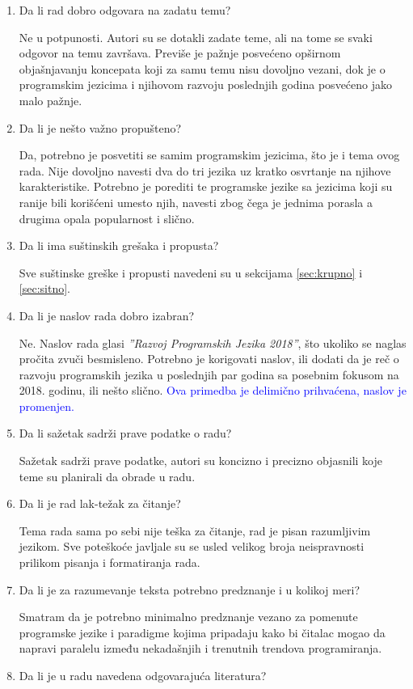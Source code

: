 \documentclass[a4paper]{report}
\newcommand{\odgovor}[1]{\textcolor{blue}{#1}}
\begin{document}
\begin{enumerate}
\item Da li rad dobro odgovara na zadatu temu?\par
Ne u potpunosti. Autori su se dotakli zadate teme, ali na tome se svaki odgovor na temu završava. Previše je pažnje posvećeno opširnom objašnjavanju koncepata koji za samu temu nisu dovoljno vezani, dok je o programskim jezicima i njihovom razvoju poslednjih godina posvećeno jako malo pažnje.
\item Da li je nešto važno propušteno?\par
Da, potrebno je posvetiti se samim programskim jezicima, što je i tema ovog rada. Nije dovoljno navesti dva do tri jezika uz kratko osvrtanje na njihove karakteristike. Potrebno je porediti te programske jezike sa jezicima koji su ranije bili korišćeni umesto njih, navesti zbog čega je jednima porasla a drugima opala popularnost i slično.
\item Da li ima suštinskih grešaka i propusta?\par
Sve suštinske greške i propusti navedeni su u sekcijama \ref{sec:krupno} i \ref{sec:sitno}.
\item Da li je naslov rada dobro izabran?\par
Ne. Naslov rada glasi \textit{''Razvoj Programskih Jezika 2018''}, što ukoliko se naglas pročita zvuči besmisleno. Potrebno je korigovati naslov, ili dodati da je reč o razvoju programskih jezika u poslednjih par godina sa posebnim fokusom na 2018. godinu, ili nešto slično.
\odgovor{Ova primedba je delimično prihvaćena, naslov je promenjen.}
\item Da li sažetak sadrži prave podatke o radu?\par
Sažetak sadrži prave podatke, autori su koncizno i precizno objasnili koje teme su planirali da obrade u radu.
\item Da li je rad lak-težak za čitanje?\par
Tema rada sama po sebi nije teška za čitanje, rad je pisan razumljivim jezikom. Sve poteškoće javljale su se usled velikog broja neispravnosti prilikom pisanja i formatiranja rada.
\item Da li je za razumevanje teksta potrebno predznanje i u kolikoj meri?\par
Smatram da je potrebno minimalno predznanje vezano za pomenute programske jezike i paradigme kojima pripadaju kako bi čitalac mogao da napravi paralelu između nekadašnjih i trenutnih trendova programiranja.
\item Da li je u radu navedena odgovarajuća literatura?\par

\end{enumerate}
\end{document}
